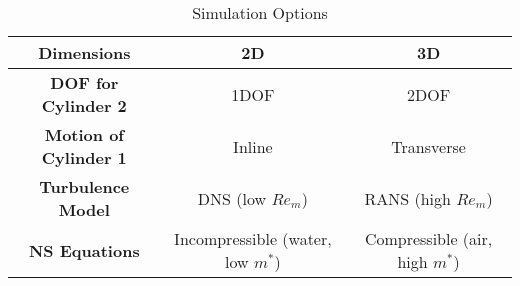   \begin{table} [tbh]
  	\centering
  	\caption{Simulation Options}
  	\label{simoptions}
  	{\renewcommand{\arraystretch}{1.2}
  		\begin{tabular}{|c|c|c|} \hline 
  			\textbf{Dimensions} & 2D & 3D \\ \hline
  			\textbf{DOF for Cylinder 2}& 1DOF & 2DOF\\ \hline
  			\textbf{Motion of Cylinder 1} & Inline & Transverse \\ \hline 
  			\textbf{Turbulence Model} & DNS (low $ Re_m $) & RANS (high $ Re_m $) \\ \hline
  			\textbf{NS Equations} & Incompressible (water, low $ m^* $) & Compressible (air, high $ m^* $) \\ \hline
  		\end{tabular}
  	}
  \end{table}
 




% 
% 







